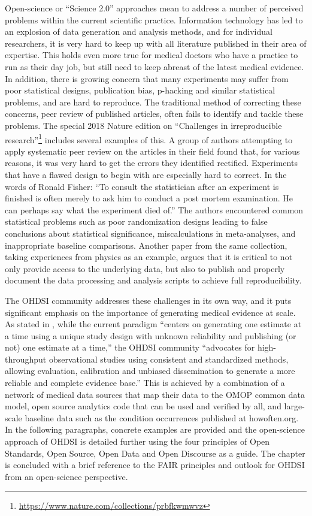 \documentclass[11pt]{book}
\let\rmarkdownfootnote\footnote%
\def\footnote{\protect\rmarkdownfootnote}
\theoremstyle{definition}
\theoremstyle{definition}
\theoremstyle{definition}
\theoremstyle{remark}
\begin{document}
Open-science or ``Science 2.0'' \citep{wiki:Science_2.0} approaches mean
to address a number of perceived problems within the current scientific
practice. Information technology has led to an explosion of data
generation and analysis methods, and for individual researchers, it is
very hard to keep up with all literature published in their area of
expertise. This holds even more true for medical doctors who have a
practice to run as their day job, but still need to keep abreast of the
latest medical evidence. In addition, there is growing concern that many
experiments may suffer from poor statistical designs, publication bias,
p-hacking and similar statistical problems, and are hard to reproduce.
The traditional method of correcting these concerns, peer review of
published articles, often fails to identify and tackle these problems.
The special 2018 Nature edition on ``Challenges in irreproducible
research''\footnote{\url{https://www.nature.com/collections/prbfkwmwvz}}
includes several examples of this. A group of authors attempting to
apply systematic peer review on the articles in their field found that,
for various reasons, it was very hard to get the errors they identified
rectified. Experiments that have a flawed design to begin with are
especially hard to correct. In the words of Ronald Fisher: ``To consult
the statistician after an experiment is finished is often merely to ask
him to conduct a post mortem examination. He can perhaps say what the
experiment died of.'' \citep{wikiquote:Ronald_Fisher} The authors
encountered common statistical problems such as poor randomization
designs leading to false conclusions about statistical significance,
miscalculations in meta-analyses, and inappropriate baseline
comparisons. \citep{allison_2016} Another paper from the same
collection, taking experiences from physics as an example, argues that
it is critical to not only provide access to the underlying data, but
also to publish and properly document the data processing and analysis
scripts to achieve full reproducibility. \citep{Chen2018}

The OHDSI community addresses these challenges in its own way, and it
puts significant emphasis on the importance of generating medical
evidence at scale. As stated in \citet{schuemie_2018b}, while the
current paradigm ``centers on generating one estimate at a time using a
unique study design with unknown reliability and publishing (or not) one
estimate at a time,'' the OHDSI community ``advocates for
high-throughput observational studies using consistent and standardized
methods, allowing evaluation, calibration and unbiased dissemination to
generate a more reliable and complete evidence base.'' This is achieved
by a combination of a network of medical data sources that map their
data to the OMOP common data model, open source analytics code that can
be used and verified by all, and large-scale baseline data such as the
condition occurrences published at howoften.org. In the following
paragraphs, concrete examples are provided and the open-science approach
of OHDSI is detailed further using the four principles of Open
Standards, Open Source, Open Data and Open Discourse as a guide. The
chapter is concluded with a brief reference to the FAIR principles and
outlook for OHDSI from an open-science perspective.
\end{document}

